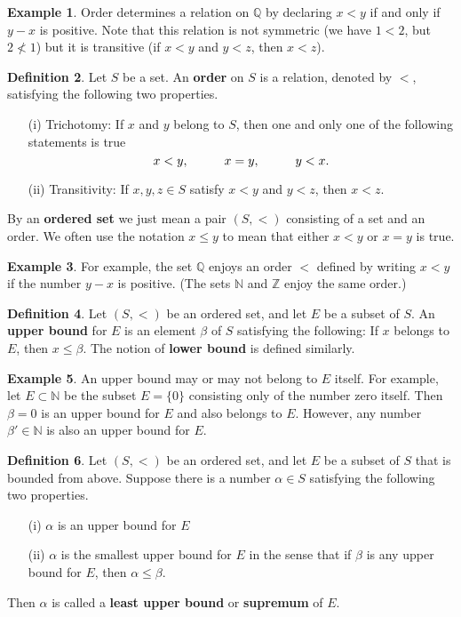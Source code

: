 \documentclass[12pt]{article}
\theoremstyle{definition}
\newtheorem{definition}{Definition}
\newtheorem{example}[definition]{Example}
\theoremstyle{theorem}
\begin{document}
\begin{example}
Order determines a relation on $\mathbb{Q}$ by declaring $x < y$ if and only if $y - x$ is positive. Note that this relation is not symmetric (we have $1 < 2$, but $2 \not< 1$) but it is transitive (if $x < y$ and $y < z$, then $x < z$). 
\end{example}

\begin{definition}
Let $S$ be a set. An \textbf{order} on $S$ is a relation, denoted by $<$, satisfying the following two properties. 
\begin{enumerate}
\item[(i)] Trichotomy: If $x$ and $y$ belong to $S$, then one and only one of the following statements is true 
\[
x < y, \hspace{10mm} x = y, \hspace{10mm} y < x.
\]
\item[(ii)] Transitivity: If $x,y,z \in S$ satisfy $x < y$ and $y < z$, then $x < z$. 
\end{enumerate}
By an \textbf{ordered set} we just mean a pair $(S, <)$ consisting of a set and an order. We often use the notation $x \leqslant y$ to mean that either $x < y$ or $x = y$ is true. 
\end{definition}

\begin{example}
For example, the set $\mathbb{Q}$ enjoys an order $<$ defined by writing $x < y$ if the number $y - x$ is positive. (The sets $\mathbb{N}$ and $\mathbb{Z}$ enjoy the same order.)
\end{example}

\begin{definition}
Let $(S, <)$ be an ordered set, and let $E$ be a subset of $S$. An \textbf{upper bound} for $E$ is an element $\beta$ of $S$ satisfying the following: If $x$ belongs to $E$, then $x \leqslant \beta$. The notion of \textbf{lower bound} is defined similarly. 
\end{definition}

\begin{example}
An upper bound may or may not belong to $E$ itself. For example, let $E \subset \mathbb{N}$ be the subset $E = \{0\}$ consisting only of the number zero itself. Then $\beta = 0$ is an upper bound for $E$ and also belongs to $E$. However, any number $\beta' \in \mathbb{N}$ is also an upper bound for $E$. 
\end{example}

\begin{definition}
Let $(S, <)$ be an ordered set, and let $E$ be a subset of $S$ that is bounded from above. Suppose there is a number $\alpha \in S$ satisfying the following two properties.
\begin{enumerate}
\item[(i)] $\alpha$ is an upper bound for $E$
\item[(ii)] $\alpha$ is the smallest upper bound for $E$ in the sense that if $\beta$ is any upper bound for $E$, then $\alpha \leqslant \beta$. 
\end{enumerate} 
Then $\alpha$ is called a \textbf{least upper bound} or \textbf{supremum} of $E$. 
\end{definition}
\end{document}
